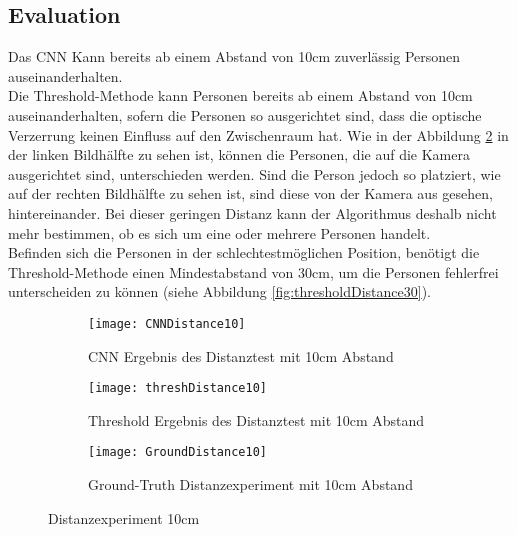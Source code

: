 \subsection{Evaluation}


Das \gls{CNN} Kann bereits ab einem Abstand von 10cm zuverlässig Personen auseinanderhalten.\\
Die Threshold-Methode kann Personen bereits ab einem Abstand von 10cm auseinanderhalten, sofern die Personen so ausgerichtet sind, dass die optische Verzerrung keinen Einfluss auf den Zwischenraum hat. Wie in der Abbildung \ref{fig:thresholdDistance10} in der linken Bildhälfte zu sehen ist, können die Personen, die auf die Kamera ausgerichtet sind, unterschieden werden. Sind die Person jedoch so platziert, wie auf der rechten Bildhälfte zu sehen ist, sind diese von der Kamera aus gesehen, hintereinander. Bei dieser geringen Distanz kann der Algorithmus deshalb nicht mehr bestimmen, ob es sich um eine oder mehrere Personen handelt.\\
Befinden sich die Personen in der schlechtestmöglichen Position, benötigt die Threshold-Methode einen Mindestabstand von 30cm, um die Personen fehlerfrei unterscheiden zu können (siehe Abbildung \ref{fig:thresholdDistance30}).

\begin{figure}[H]
	\begin{subfigure}{.45\linewidth}
		\centering
		\texttt{[image: CNNDistance10]}
		\caption{\gls{CNN} Ergebnis des Distanztest mit 10cm Abstand}
		\label{fig:cnnDistance10}
	\end{subfigure}\hfill%
	\begin{subfigure}{.45\linewidth}
		\centering
		\texttt{[image: threshDistance10]}
		\caption{Threshold Ergebnis des Distanztest mit 10cm Abstand}
		\label{fig:thresholdDistance10}
	\end{subfigure}\hfill
	\begin{subfigure}{\linewidth}
		\centering
		\texttt{[image: GroundDistance10]}
		\caption{Ground-Truth Distanzexperiment mit 10cm Abstand}
		\label{fig:groundDistance10}
	\end{subfigure}
	\caption{Distanzexperiment 10cm}
	\label{fig:Distance10}
\end{figure}

